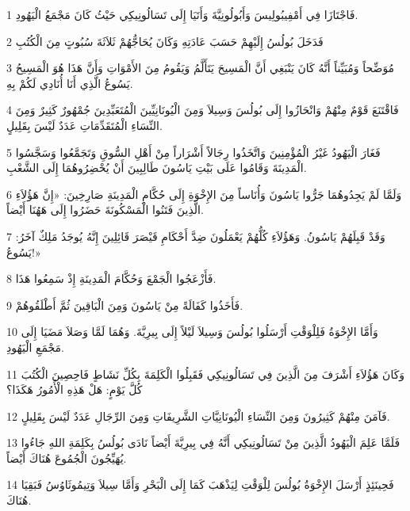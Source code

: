 \par 1 فَاجْتَازَا فِي أَمْفِيبُولِيسَ وَأَبُولُونِيَّةَ وَأَتَيَا إِلَى تَسَالُونِيكِي حَيْثُ كَانَ مَجْمَعُ الْيَهُودِ.
\par 2 فَدَخَلَ بُولُسُ إِلَيْهِمْ حَسَبَ عَادَتِهِ وَكَانَ يُحَاجُّهُمْ ثَلاَثَةَ سُبُوتٍ مِنَ الْكُتُبِ
\par 3 مُوَضِّحاً وَمُبَيِّناً أَنَّهُ كَانَ يَنْبَغِي أَنَّ الْمَسِيحَ يَتَأَلَّمُ وَيَقُومُ مِنَ الأَمْوَاتِ وَأَنَّ هَذَا هُوَ الْمَسِيحُ يَسُوعُ الَّذِي أَنَا أُنَادِي لَكُمْ بِهِ.
\par 4 فَاقْتَنَعَ قَوْمٌ مِنْهُمْ وَانْحَازُوا إِلَى بُولُسَ وَسِيلاَ وَمِنَ الْيُونَانِيِّينَ الْمُتَعَبِّدِينَ جُمْهُورٌ كَثِيرٌ وَمِنَ النِّسَاءِ الْمُتَقَدِّمَاتِ عَدَدٌ لَيْسَ بِقَلِيلٍ.
\par 5 فَغَارَ الْيَهُودُ غَيْرُ الْمُؤْمِنِينَ وَاتَّخَذُوا رِجَالاً أَشْرَاراً مِنْ أَهْلِ السُّوقِ وَتَجَمَّعُوا وَسَجَّسُوا الْمَدِينَةَ وَقَامُوا عَلَى بَيْتِ يَاسُونَ طَالِبِينَ أَنْ يُحْضِرُوهُمَا إِلَى الشَّعْبِ.
\par 6 وَلَمَّا لَمْ يَجِدُوهُمَا جَرُّوا يَاسُونَ وَأُنَاساً مِنَ الإِخْوَةِ إِلَى حُكَّامِ الْمَدِينَةِ صَارِخِينَ: «إِنَّ هَؤُلاَءِ الَّذِينَ فَتَنُوا الْمَسْكُونَةَ حَضَرُوا إِلَى هَهُنَا أَيْضاً.
\par 7 وَقَدْ قَبِلَهُمْ يَاسُونُ. وَهَؤُلاَءِ كُلُّهُمْ يَعْمَلُونَ ضِدَّ أَحْكَامِ قَيْصَرَ قَائِلِينَ إِنَّهُ يُوجَدُ مَلِكٌ آخَرُ: يَسُوعُ!»
\par 8 فَأَزْعَجُوا الْجَمْعَ وَحُكَّامَ الْمَدِينَةِ إِذْ سَمِعُوا هَذَا.
\par 9 فَأَخَذُوا كَفَالَةً مِنْ يَاسُونَ وَمِنَ الْبَاقِينَ ثُمَّ أَطْلَقُوهُمْ.
\par 10 وَأَمَّا الإِخْوَةُ فَلِلْوَقْتِ أَرْسَلُوا بُولُسَ وَسِيلاَ لَيْلاً إِلَى بِيرِيَّةَ. وَهُمَا لَمَّا وَصَلاَ مَضَيَا إِلَى مَجْمَعِ الْيَهُودِ.
\par 11 وَكَانَ هَؤُلاَءِ أَشْرَفَ مِنَ الَّذِينَ فِي تَسَالُونِيكِي فَقَبِلُوا الْكَلِمَةَ بِكُلِّ نَشَاطٍ فَاحِصِينَ الْكُتُبَ كُلَّ يَوْمٍ: هَلْ هَذِهِ الْأُمُورُ هَكَذَا؟
\par 12 فَآمَنَ مِنْهُمْ كَثِيرُونَ وَمِنَ النِّسَاءِ الْيُونَانِيَّاتِ الشَّرِيفَاتِ وَمِنَ الرِّجَالِ عَدَدٌ لَيْسَ بِقَلِيلٍ.
\par 13 فَلَمَّا عَلِمَ الْيَهُودُ الَّذِينَ مِنْ تَسَالُونِيكِي أَنَّهُ فِي بِيرِيَّةَ أَيْضاً نَادَى بُولُسُ بِكَلِمَةِ اللهِ جَاءُوا يُهَيِّجُونَ الْجُمُوعَ هُنَاكَ أَيْضاً.
\par 14 فَحِينَئِذٍ أَرْسَلَ الإِخْوَةُ بُولُسَ لِلْوَقْتِ لِيَذْهَبَ كَمَا إِلَى الْبَحْرِ وَأَمَّا سِيلاَ وَتِيمُوثَاوُسُ فَبَقِيَا هُنَاكَ.

